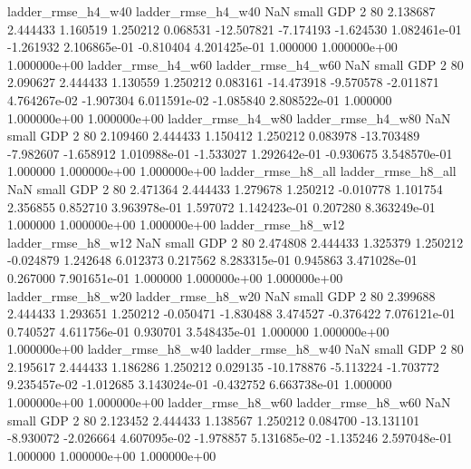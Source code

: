       ladder_rmse_h4_w40       ladder_rmse_h4_w40                   NaN      small      GDP                 2 80 2.138687       2.444433 1.160519       1.250212    0.068531    -12.507821     -7.174193    -1.624530   1.082461e-01 -1.261932 2.106865e-01    -0.810404   4.201425e-01            1.000000    1.000000e+00        1.000000e+00
      ladder_rmse_h4_w60       ladder_rmse_h4_w60                   NaN      small      GDP                 2 80 2.090627       2.444433 1.130559       1.250212    0.083161    -14.473918     -9.570578    -2.011871   4.764267e-02 -1.907304 6.011591e-02    -1.085840   2.808522e-01            1.000000    1.000000e+00        1.000000e+00
      ladder_rmse_h4_w80       ladder_rmse_h4_w80                   NaN      small      GDP                 2 80 2.109460       2.444433 1.150412       1.250212    0.083978    -13.703489     -7.982607    -1.658912   1.010988e-01 -1.533027 1.292642e-01    -0.930675   3.548570e-01            1.000000    1.000000e+00        1.000000e+00
      ladder_rmse_h8_all       ladder_rmse_h8_all                   NaN      small      GDP                 2 80 2.471364       2.444433 1.279678       1.250212   -0.010778      1.101754      2.356855     0.852710   3.963978e-01  1.597072 1.142423e-01     0.207280   8.363249e-01            1.000000    1.000000e+00        1.000000e+00
      ladder_rmse_h8_w12       ladder_rmse_h8_w12                   NaN      small      GDP                 2 80 2.474808       2.444433 1.325379       1.250212   -0.024879      1.242648      6.012373     0.217562   8.283315e-01  0.945863 3.471028e-01     0.267000   7.901651e-01            1.000000    1.000000e+00        1.000000e+00
      ladder_rmse_h8_w20       ladder_rmse_h8_w20                   NaN      small      GDP                 2 80 2.399688       2.444433 1.293651       1.250212   -0.050471     -1.830488      3.474527    -0.376422   7.076121e-01  0.740527 4.611756e-01     0.930701   3.548435e-01            1.000000    1.000000e+00        1.000000e+00
      ladder_rmse_h8_w40       ladder_rmse_h8_w40                   NaN      small      GDP                 2 80 2.195617       2.444433 1.186286       1.250212    0.029135    -10.178876     -5.113224    -1.703772   9.235457e-02 -1.012685 3.143024e-01    -0.432752   6.663738e-01            1.000000    1.000000e+00        1.000000e+00
      ladder_rmse_h8_w60       ladder_rmse_h8_w60                   NaN      small      GDP                 2 80 2.123452       2.444433 1.138567       1.250212    0.084700    -13.131101     -8.930072    -2.026664   4.607095e-02 -1.978857 5.131685e-02    -1.135246   2.597048e-01            1.000000    1.000000e+00        1.000000e+00
